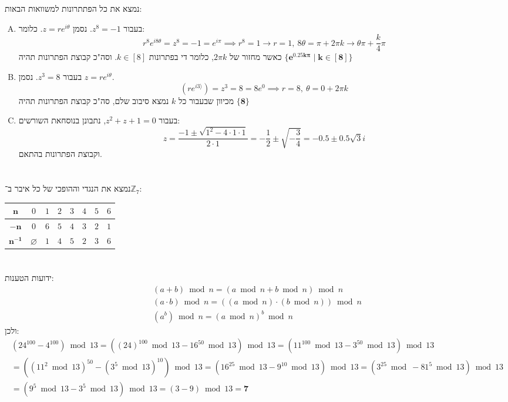 \documentclass[]{article}
\newcommand\Z     {\mathbb{Z}}
\newcommand\ra    {\rangle}
\newcommand\ta    {\theta}
\newcommand\op    {^{-1}}
\begin{document}
	\section{}
	נמצא את כל הפתתרונות למשוואות הבאות: 
	\begin{enumerate}[A.]
		\item בעבור $z^8 = -1$. נסמן $z = re^{i\ta}$. כלומר: 
		\[ r^8e^{i8\ta} = z^8 = -1 = e^{i \pi } \implies r^8 = 1 \to r = 1, \ 8\ta = \pi + 2\pi k \to \ta \pi + \frac{k}{4}\pi \]
		כאשר מחזור של $2\pi k$, כלומר די בפתרונות $k \in [8]$. 
		וסה"כ קבוצת הפתרונות תהיה $\bm{\{e^{0.25k \pi} \mid k \in [8]\}}$
		
		\item בעבור $z^3 = 8$. נסמן $z = re^{i \ta}$. 
		\[ (re^{i 3\ra}) = z^3 = 8 = 8e^{0} \implies r = 8, \ \ta = 0 + 2\pi k \]
		מכיוון שבעבור כל $k$ נמצא סיבוב שלם, סה"כ קבוצת הפתרונות תהיה $\bm{\{8\}}$
		\item בעבור $z^2 + z + 1 = 0$, נתבונן בנוסחאת השורשים: 
		\[ z = \frac{-1\pm\sqrt{1^2 - 4 \cdot 1 \cdot 1}}{2 \cdot 1} = -\frac{1}{2} \pm \sqrt{-\frac{3}{4}} = -0.5 \pm 0.5\sqrt3i \]
		וקבוצת הפתרונות בהתאם. 
	\end{enumerate}
	
	\section{}
	נמצא את הנגדי וההופכי של כל איבר ב־$\Z_7$: 
	\begin{center}
		\begin{tabular}{|c|c|c|c|c|c|c|c|}
			\hline $\bm{n}$ & $0$ & $1$ & $2$ & $3$ & $4$ & $5$ & $6$ \\
			\hline $\bm{-n}$ & $0$ & $6$ & $5$ & $4$ & $3$ & $2$ & $1$ \\
			\hline $\bm{n\op}$ & $\varnothing$ & $1$ & $4$ & $5$ & $2$ & $3$ & $6$ \\
			\hline
		\end{tabular}
	\end{center}
	
	\section{}
	ידועות הטענות: 
	\begin{gather*}
		(a + b) \bmod n = (a \bmod n + b \bmod n) \bmod n \\
		(a \cdot b) \bmod n = ((a \bmod n) \cdot (b \bmod n)) \bmod n \\
		(a^b)\bmod n = (a \bmod n)^b \bmod n
	\end{gather*}
	ולכן: 
	\begin{multline*}
		(24^{100} - 4^{100})\bmod 13 = ((24)^{100}\bmod 13 - 16^{50}\bmod 13)\bmod 13 = (11^{100}\bmod 13 - 3^{50}\bmod 13)\bmod 13 \\
		= ((11^2 \bmod 13)^{50} - (3^5\bmod 13)^{10})\bmod 13 = (16^{25}\bmod 13 - 9^{10}\bmod 13) \bmod 13 = (3^{25}\bmod - 81^{5}\bmod 13) \bmod 13 \\
		= (9^{5}\bmod 13 - 3^{5}\bmod 13)\bmod 13 = (3 - 9)\bmod 13 = \bm{7}
	\end{multline*}
	
\end{document}

